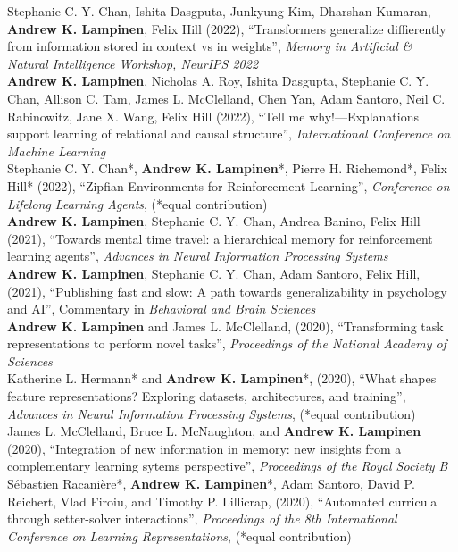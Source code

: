 \documentclass[margin]{res}
\begin{document}
\begin{resume}
Stephanie C. Y. Chan, Ishita Dasgputa, Junkyung Kim, Dharshan Kumaran, \textbf{Andrew K. Lampinen}, Felix Hill (2022), {``Transformers generalize diffierently from information stored in context vs in weights'',} \textit{Memory in Artificial \& Natural Intelligence Workshop, NeurIPS 2022} \\[3pt]
\textbf{Andrew K. Lampinen}, Nicholas A. Roy, Ishita Dasgupta, Stephanie C. Y. Chan, Allison C. Tam, James L. McClelland, Chen Yan, Adam Santoro, Neil C. Rabinowitz, Jane X. Wang, Felix Hill (2022), {``Tell me why!---Explanations support learning of relational and causal structure'',} \textit{International Conference on Machine Learning} \\[3pt] 
Stephanie C. Y. Chan*, \textbf{Andrew K. Lampinen}*, Pierre H. Richemond*, Felix Hill* (2022), {``Zipfian Environments for Reinforcement Learning'',} \textit{Conference on Lifelong Learning Agents}, (*equal contribution) \\[3pt] 
\textbf{Andrew K. Lampinen}, Stephanie C. Y. Chan, Andrea Banino, Felix Hill (2021), {``Towards mental time travel: a hierarchical memory for reinforcement learning agents'',} \textit{Advances in Neural Information Processing Systems} \\[3pt] 
\textbf{Andrew K. Lampinen}, Stephanie C. Y. Chan, Adam Santoro, Felix Hill, (2021), {``Publishing fast and slow: A path towards generalizability in psychology and AI'',} Commentary in \textit{Behavioral and Brain Sciences} \\[3pt] 
\textbf{Andrew K. Lampinen} and James L. McClelland, (2020), {``Transforming task representations to perform novel tasks'',} \textit{Proceedings of the National Academy of Sciences} \\[3pt] 
Katherine L. Hermann* and \textbf{Andrew K. Lampinen}*, (2020), {``What shapes feature representations? Exploring datasets, architectures, and training'',} \textit{Advances in Neural Information Processing Systems}, (*equal contribution) \\[3pt] 
James L. McClelland, Bruce L. McNaughton, and \textbf{Andrew K. Lampinen} (2020), {``Integration of new information in memory: new insights from a complementary learning sytems perspective''}, \textit{Proceedings of the Royal Society B} \\[3pt]
S\'ebastien Racani\`ere*, \textbf{Andrew K. Lampinen}*, Adam Santoro, David P. Reichert, Vlad Firoiu, and Timothy P. Lillicrap, (2020), {``Automated curricula through setter-solver interactions'',} \textit{Proceedings of the 8th International Conference on Learning Representations}, (*equal contribution) \\ [3pt] 

\end{resume}
\end{document}
